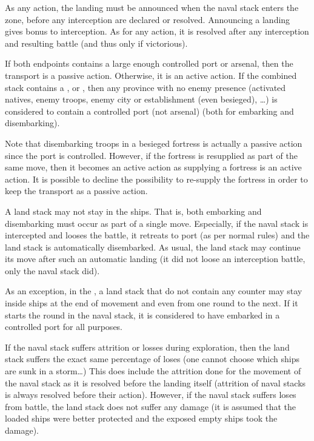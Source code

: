 As any action, the landing must be announced when the naval stack enters the
zone, before any interception are declared or resolved. Announcing a landing
gives bonus to interception. As for any action, it is resolved after any
interception and resulting battle (and thus only if victorious).

If both endpoints contains a large enough controlled port or arsenal, then the
transport is a passive action. Otherwise, it is an active action. If the
combined stack contains a \LeaderE, \LeaderC or \LeaderGov, then any province
with no enemy presence (activated natives, enemy troops, enemy city or
establishment (even besieged), \ldots) is considered to contain a controlled
port (not arsenal) (both for embarking and disembarking).

Note that disembarking troops in a besieged fortress is actually a passive
action since the port is controlled. However, if the fortress is resupplied as
part of the same move, then it becomes an active action as supplying a
fortress is an active action. It is possible to decline the possibility to
re-supply the fortress in order to keep the transport as a passive action.

A land stack may not stay in the ships. That is, both embarking and
disembarking must occur as part of a single move. Especially, if the naval
stack is intercepted and looses the battle, it retreats to port (as per normal
rules) and the land stack is automatically disembarked. As usual, the land
stack may continue its move after such an automatic landing (it did not loose
an interception battle, only the naval stack did).

As an exception, in the \ROTW, a land stack that do not contain any \ARMY
counter may stay inside ships at the end of movement and even from one round
to the next. If it starts the round in the naval stack, it is considered to
have embarked in a controlled port for all purposes.

If the naval stack suffers attrition or losses during exploration, then the
land stack suffers the exact same percentage of loses (one cannot choose which
ships are sunk in a storm\ldots) This does include the attrition done for the
movement of the naval stack as it is resolved before the landing itself
(attrition of naval stacks is always resolved before their action). However,
if the naval stack suffers loses from battle, the land stack does not suffer
any damage (it is assumed that the loaded ships were better protected and the
exposed empty ships took the damage).

